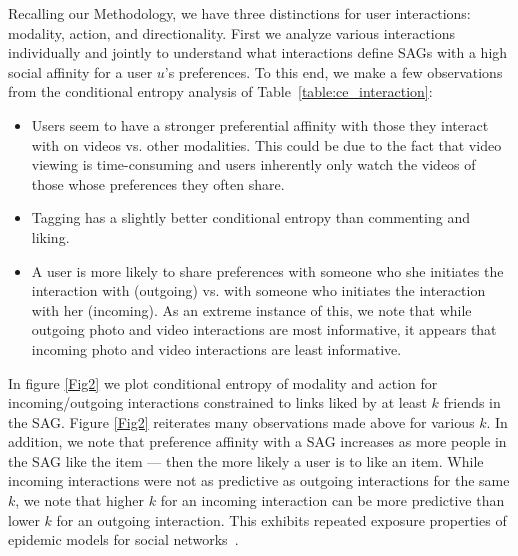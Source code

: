 Recalling our Methodology, we have three distinctions for user
interactions: modality, action, and directionality.  First we analyze
various interactions individually and jointly to understand what
interactions define SAGs with a high social affinity for a user $u$'s
preferences.  To this end, we make a few observations from the
conditional entropy analysis of Table~\ref{table:ce_interaction}:
\begin{itemize}
\item Users seem to have a stronger preferential affinity with those
  they interact with on videos vs. other modalities.  This could be
  due to the fact that video viewing is time-consuming and users
  inherently only watch the videos of those whose preferences they
  often share.
\item Tagging has a slightly better conditional entropy than
  commenting and liking.%
\item A user is more likely to share preferences with someone who she
  initiates the interaction with (outgoing) vs. with someone who
  initiates the interaction with her (incoming).  As an extreme
  instance of this, we note that while outgoing photo and video
  interactions are most informative, it appears that incoming photo
  and video interactions are least informative.
\end{itemize}

In figure \ref{Fig2} we plot conditional entropy of modality and
action for incoming/outgoing interactions constrained to links
liked by at least $k$ friends in the SAG.  Figure \ref{Fig2} reiterates
many observations made above for various $k$.  In addition, we note that
preference affinity with a SAG increases as more people in the SAG
like the item --- then the more likely a user is to like an item.
While incoming interactions were not as predictive as outgoing
interactions for the same $k$, we note that higher $k$ for an incoming
interaction can be more predictive than lower $k$ for an outgoing
interaction.  This exhibits repeated exposure properties of epidemic
models for social networks~\cite{Golub2010selectionbiase}.


